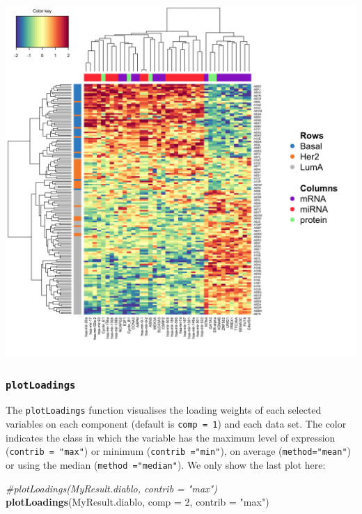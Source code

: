 \documentclass[]{book}
\newenvironment{Shaded}{\begin{snugshade}}{\end{snugshade}}
\newcommand{\CommentTok}[1]{\textcolor[rgb]{0.56,0.35,0.01}{\textit{#1}}}
\newcommand{\DataTypeTok}[1]{\textcolor[rgb]{0.13,0.29,0.53}{#1}}
\newcommand{\DecValTok}[1]{\textcolor[rgb]{0.00,0.00,0.81}{#1}}
\newcommand{\KeywordTok}[1]{\textcolor[rgb]{0.13,0.29,0.53}{\textbf{#1}}}
\newcommand{\NormalTok}[1]{#1}
\newcommand{\StringTok}[1]{\textcolor[rgb]{0.31,0.60,0.02}{#1}}
\begin{document}
\begin{center}\includegraphics[width=0.75\linewidth,]{Figures/06-cimDiablo-1} \end{center}

\hypertarget{plotloadings}{%
\subsubsection{\texorpdfstring{\texttt{plotLoadings}}{plotLoadings}}\label{plotloadings}}

The \texttt{plotLoadings} function visualises the loading weights of each selected variables on each component (default is \texttt{comp\ =\ 1}) and each data set. The color indicates the class in which the variable has the maximum level of expression (\texttt{contrib\ =\ "max"}) or minimum (\texttt{contrib\ ="min"}), on average (\texttt{method="mean"}) or using the median (\texttt{method\ ="median"}). We only show the last plot here:

\begin{Shaded}
\begin{Highlighting}[]
\CommentTok{#plotLoadings(MyResult.diablo, contrib = "max")}
\KeywordTok{plotLoadings}\NormalTok{(MyResult.diablo, }\DataTypeTok{comp =} \DecValTok{2}\NormalTok{, }\DataTypeTok{contrib =} \StringTok{"max"}\NormalTok{)}
\end{Highlighting}
\end{Shaded}
\end{document}
